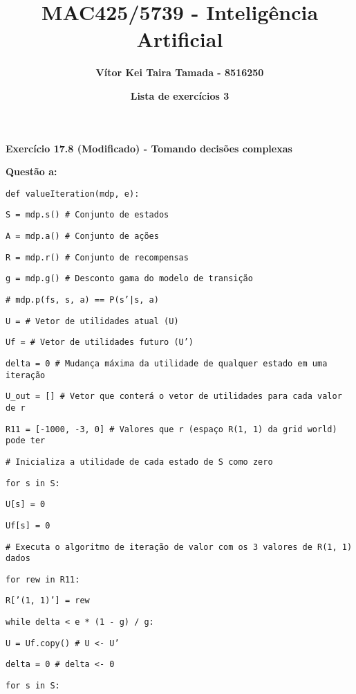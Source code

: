 \documentclass{article}
\title{\textbf{MAC425/5739 - Inteligência Artificial}}
\author{\textbf{Vítor Kei Taira Tamada - 8516250}}
\date{\textbf{Lista de exercícios 3}}
\begin{document}
\maketitle

\textbf{\Large{Exercício 17.8 (Modificado) - Tomando decisões complexas}}

\bigskip
\quad \large{\textbf{Questão a:}}

\qquad\texttt{def valueIteration(mdp, e):}

\qquad\quad\texttt{S = mdp.s() \# Conjunto de estados}

\qquad\quad\texttt{A = mdp.a() \# Conjunto de ações}

\qquad\quad\texttt{R = mdp.r() \# Conjunto de recompensas}

\qquad\quad\texttt{g = mdp.g() \# Desconto gama do modelo de transição}

\qquad\quad\texttt{\# mdp.p(fs, s, a) == P(s'|s, a)}

\bigskip
\qquad\quad\texttt{U = {} \# Vetor de utilidades atual (U)}

\qquad\quad\texttt{Uf = {} \# Vetor de utilidades futuro (U')}

\qquad\quad\texttt{delta = 0 \# Mudança máxima da utilidade de qualquer estado em uma iteração}

\qquad\quad\texttt{U\_out = [] \# Vetor que conterá o vetor de utilidades para cada valor de r}

\bigskip
\qquad\quad\texttt{R11 = [-1000, -3, 0] \# Valores que r (espaço R(1, 1) da grid world) pode ter}

\bigskip
\qquad\quad\texttt{\# Inicializa a utilidade de cada estado de S como zero}

\qquad\quad\texttt{for s in S:}

\qquad\qquad\texttt{U[s] = 0}

\qquad\qquad\texttt{Uf[s] = 0}

\bigskip
\qquad\quad\texttt{\# Executa o algoritmo de iteração de valor com os 3 valores de R(1, 1) dados}

\qquad\quad\texttt{for rew in R11:}

\qquad\qquad\texttt{R['(1, 1)'] = rew}

\bigskip
\qquad\qquad\texttt{while delta < e * (1 - g) / g:}

\qquad\qquad\quad\texttt{U = Uf.copy() \# U <- U'}

\qquad\qquad\quad\texttt{delta = 0 \# delta <- 0}

\bigskip
\qquad\qquad\quad\texttt{for s in S:}
\end{document}
